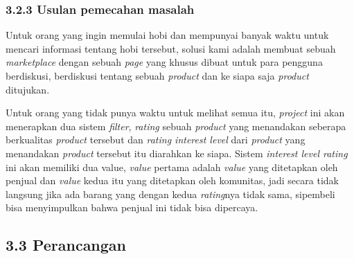 \documentclass[a4paper]{article}
\begin{document}
\subsubsection*{3.2.3 Usulan pemecahan masalah}
Untuk orang yang ingin memulai hobi dan mempunyai banyak waktu untuk mencari informasi tentang hobi tersebut, solusi kami adalah membuat sebuah \textit{marketplace} dengan sebuah \textit{page} yang khusus dibuat untuk para pengguna berdiskusi, berdiskusi tentang sebuah \textit{product} dan ke siapa saja \textit{product} ditujukan.


Untuk orang yang tidak punya waktu untuk melihat semua itu, \textit{project} ini akan menerapkan dua sistem \textit{filter}, \textit{rating} sebuah \textit{product} yang menandakan seberapa berkualitas \textit{product} tersebut dan \textit{rating interest level} dari \textit{product} yang menandakan \textit{product} tersebut itu diarahkan ke siapa. Sistem \textit{interest level rating} ini akan memiliki dua value, \textit{value} pertama adalah \textit{value} yang ditetapkan oleh penjual dan \textit{value} kedua itu yang ditetapkan oleh komunitas, jadi secara tidak langsung jika ada barang yang dengan kedua \textit{rating}nya tidak sama, sipembeli bisa menyimpulkan bahwa penjual ini tidak bisa dipercaya.


\subsection*{3.3 Perancangan}
\end{document}
